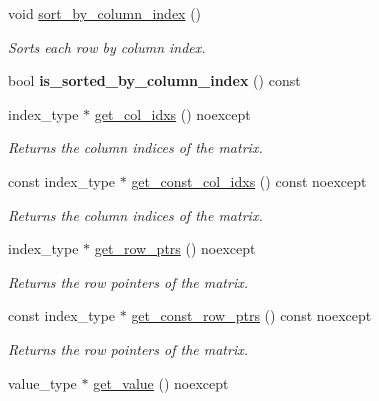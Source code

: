\begin{DoxyCompactItemize}
\mbox{\label{classgko_1_1matrix_1_1Sparsity_a061c5ef316fe8732aedb12713b02faba}} 
void \hyperlink{classgko_1_1matrix_1_1Sparsity_a061c5ef316fe8732aedb12713b02faba}{sort\+\_\+by\+\_\+column\+\_\+index} ()
\begin{DoxyCompactList}\small\item\em Sorts each row by column index. \end{DoxyCompactList}\item 
\mbox{\label{classgko_1_1matrix_1_1Sparsity_a0c04a011a968188dc9c0ac5bc58df1f4}} 
bool {\bfseries is\+\_\+sorted\+\_\+by\+\_\+column\+\_\+index} () const
\item 
index\+\_\+type $\ast$ \hyperlink{classgko_1_1matrix_1_1Sparsity_a4ea6a0fd1cdd173d360f64efd6a8eaa9}{get\+\_\+col\+\_\+idxs} () noexcept
\begin{DoxyCompactList}\small\item\em Returns the column indices of the matrix. \end{DoxyCompactList}\item 
const index\+\_\+type $\ast$ \hyperlink{classgko_1_1matrix_1_1Sparsity_af17ddb05d2e48bc1b8d0b169602c3f9c}{get\+\_\+const\+\_\+col\+\_\+idxs} () const noexcept
\begin{DoxyCompactList}\small\item\em Returns the column indices of the matrix. \end{DoxyCompactList}\item 
index\+\_\+type $\ast$ \hyperlink{classgko_1_1matrix_1_1Sparsity_af16880db90b23fd70c14cf444a854eaf}{get\+\_\+row\+\_\+ptrs} () noexcept
\begin{DoxyCompactList}\small\item\em Returns the row pointers of the matrix. \end{DoxyCompactList}\item 
const index\+\_\+type $\ast$ \hyperlink{classgko_1_1matrix_1_1Sparsity_a930ba2c53f2c7e667265e836240b997a}{get\+\_\+const\+\_\+row\+\_\+ptrs} () const noexcept
\begin{DoxyCompactList}\small\item\em Returns the row pointers of the matrix. \end{DoxyCompactList}\item 
value\+\_\+type $\ast$ \hyperlink{classgko_1_1matrix_1_1Sparsity_a1c089c1ee66116b771e4fe8b6fdf3f3b}{get\+\_\+value} () noexcept

\end{DoxyCompactItemize}
